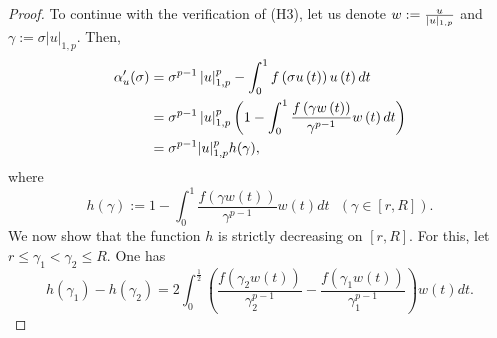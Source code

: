 \documentclass{birkjour}
\theoremstyle{definition}
\theoremstyle{remark}
\numberwithin{equation}{section}
\begin{document}
\begin{proof}
To continue with the verification of (H3), let us denote $w:=\frac{u}{%
|u|_{1,p}}$ and $\gamma :=\sigma \left\vert u\right\vert _{1,p}$. Then,
\begin{align*}
\alpha _{u}^{\prime }(\sigma )& =\sigma ^{p-1}\left\vert u\right\vert
_{1,p}^{p}-\int_{0}^{1}f\left( \sigma u\left( t\right) \right) u\left(
t\right) dt \\
& =\sigma ^{p-1}\left\vert u\right\vert _{1,p}^{p}\left( 1-\int_{0}^{1}\frac{%
f\left( \gamma w\left( t\right) \right) }{\gamma ^{p-1}}w\left( t\right)
dt\right) \\
& =\sigma ^{p-1}|u|_{1,p}^{p}h(\gamma ),
\end{align*}%
where
\begin{equation*}
h(\gamma ):=1-\int_{0}^{1}\frac{f(\gamma w(t))}{\gamma ^{p-1}}w(t)dt\ \ \
\left( \gamma \in \left[ r,R\right] \right) .
\end{equation*}%
We now show that the function $h$ is strictly decreasing on $\left[ r,R%
\right] .$ For this, let $r\leq \gamma _{1}<\gamma _{2}\leq R.$ One has%
\begin{equation*}
h(\gamma _{1})-h(\gamma _{2})=2\int_{0}^{\frac{1}{2}}\left( \frac{f(\gamma
_{2}w(t))}{\gamma _{2}^{p-1}}-\frac{f(\gamma _{1}w(t))}{\gamma _{1}^{p-1}}%
\right) w\left( t\right) dt.
\end{equation*}%
%
%
%
%
%
%

\end{proof}
\end{document}
